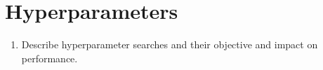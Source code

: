 \section{Hyperparameters}\label{sec:hyperparams}

\begin{enumerate}
	\item Describe hyperparameter searches and their objective and impact on performance. 
\end{enumerate}